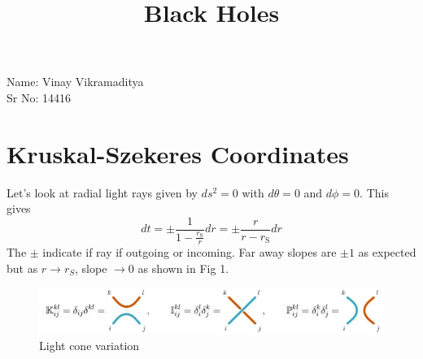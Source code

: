 ﻿\documentclass[12pt,a4paper]{article}
\begin{document}
\title{Black Holes}
\date{}
\maketitle
\small{Name: Vinay Vikramaditya}\\

\small{Sr No: 14416}\\

\newpage
\tableofcontents
\newpage



\section{Kruskal-Szekeres Coordinates}

Let's look at radial light rays given by $ds^{2}=0$ with $d\theta=0$ and $d\phi=0$. This gives 
$$
d t=\pm \frac{1}{1-\frac{r_{\mathrm{S}}}{r}} d r=\pm \frac{r}{r-r_{\mathrm{S}}} d r
$$
The $\pm$ indicate if ray if outgoing or incoming. Far away slopes are $\pm 1$ as expected but as $r \rightarrow r_{S}$, slope $\rightarrow 0$ as shown in Fig 1.
\begin{figure}[H]
  \includegraphics[width=\linewidth]{1.jpg}
  \caption{Light cone variation}
  \label{fig:1}
\end{figure}
\end{document}
